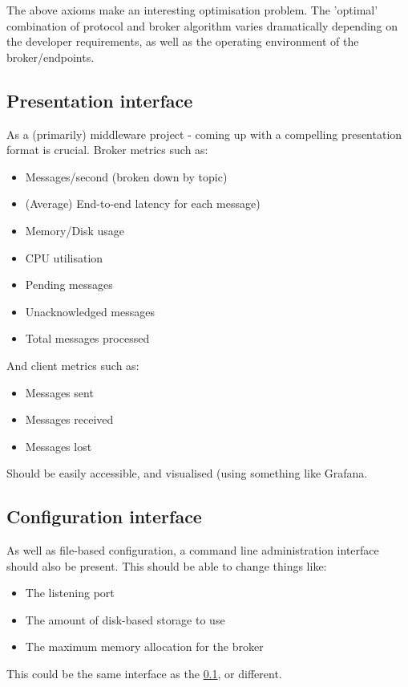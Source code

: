 The above axioms make an interesting optimisation problem. The 'optimal' combination
of protocol and broker algorithm varies dramatically depending on the developer
requirements, as well as the operating environment of the broker/endpoints.

\subsection{Presentation interface}
\label{sub:Presentation interface}

As a (primarily) middleware project - coming up with a compelling presentation
format is crucial. Broker metrics such as:

\begin{itemize}
  \item Messages/second (broken down by topic)
  \item (Average) End-to-end latency for each message)
  \item Memory/Disk usage
  \item CPU utilisation
  \item Pending messages
  \item Unacknowledged messages
  \item Total messages processed
\end{itemize}

And client metrics such as:

\begin{itemize}
  \item Messages sent
  \item Messages received
  \item Messages lost
\end{itemize}

Should be easily accessible, and visualised (using something like Grafana.

\subsection{Configuration interface}
\label{sub:Configuration interface}

As well as file-based configuration, a command line administration interface
should also be present. This should be able to change things like:

\begin{itemize}
  \item The listening port
  \item The amount of disk-based storage to use
  \item The maximum memory allocation for the broker
\end{itemize}

This could be the same interface as the \ref{sub:Presentation interface},
or different.
